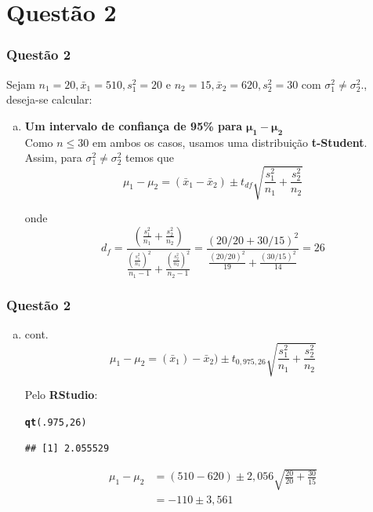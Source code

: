 \documentclass{beamer}\usepackage[]{graphicx}\usepackage[]{color}
\makeatletter
\newcommand{\hlnum}[1]{\textcolor[rgb]{0.686,0.059,0.569}{#1}}%
\newcommand{\hlstd}[1]{\textcolor[rgb]{0.345,0.345,0.345}{#1}}%
\newcommand{\hlkwd}[1]{\textcolor[rgb]{0.737,0.353,0.396}{\textbf{#1}}}%
\newenvironment{kframe}{%
 \def\at@end@of@kframe{}%
 \ifinner\ifhmode%
  \def\at@end@of@kframe{\end{minipage}}%
  \begin{minipage}{\columnwidth}%
 \fi\fi%
 \def\FrameCommand##1{\hskip\@totalleftmargin \hskip-\fboxsep
 \colorbox{shadecolor}{##1}\hskip-\fboxsep
     \hskip-\linewidth \hskip-\@totalleftmargin \hskip\columnwidth}%
 \MakeFramed {\advance\hsize-\width
   \@totalleftmargin\z@ \linewidth\hsize
   \@setminipage}}%
 {\par\unskip\endMakeFramed%
 \at@end@of@kframe}
\newenvironment{knitrout}{}{} %
\makeatother
\begin{document}
    \section{Questão 2}
    	\begin{frame}
    		\frametitle{Questão 2}
    		Sejam $n_{1} = 20, \bar{x}_{1} = 510, s^{2}_{1} = 20$ e $n_{2} = 15, \bar{x}_{2} = 620, s^{2}_{2} = 30$ com $\sigma_{1}^{2} \neq \sigma_{2}^{2}$., deseja-se calcular:\\
    		\begin{enumerate}[a)]
    			\item \textbf{{Um intervalo de confiança de 95\% para}} $\boldsymbol{\mu_{1} - \mu_{2}}$\\
    			
    			Como $n \leq 30$ em ambos os casos, usamos uma distribuição \textbf{t-Student}.  Assim, para $\sigma_{1}^{2} \neq \sigma_{2}^{2}$ temos que $$\mu_{1}-\mu_{2} = (\bar{x}_{1} - \bar{x}_{2}) \pm t_{df}\sqrt{\frac{s_{1}^{2}}{n_{1}}+\frac{s_{2}^{2}}{n_{2}}}$$
    			
    			onde $$d_{f} = \frac{(\frac{s_{1}^{2}}{n_{1}}+\frac{s_{2}^{2}}{n_{2}})}{\frac{(\frac{s_{1}^{2}}{n_{1}})^2}{n_{1}-1} + \frac{(\frac{s_{2}^{2}}{n_{2}})^2}{n_{2}-1}} = \frac{(20/20 + 30/15)^2}{\frac{(20/20)^2}{19}+\frac{(30/15)^2}{14}} = 26$$ 
    			
    		\end{enumerate}
    	\end{frame}
    	
    	\begin{frame}[fragile]
    		\frametitle{Questão 2}
    		\begin{enumerate}[a)]
    			\item cont.$$\mu_{1} - \mu_{2} = (\bar{x}_1) - \bar{x}_2)\pm t_{0,975,26}\sqrt{\frac{s_{1}^{2}}{n_{1}}+\frac{s_{2}^{2}}{n_{2}}}$$
    			
    			Pelo \textbf{RStudio}:
\begin{knitrout}
\color{fgcolor}\begin{kframe}
\begin{alltt}
\hlkwd{qt}\hlstd{(}\hlnum{.975}\hlstd{,}\hlnum{26}\hlstd{)}
\end{alltt}
\begin{verbatim}
## [1] 2.055529
\end{verbatim}
\end{kframe}
\end{knitrout}
    		\begin{align*}
		        \mu_{1} - \mu_{2} &= (510 - 620) \pm 2,056\sqrt{\frac{20}{20} + \frac{30}{15}}\\
			&= -110 \pm 3,561
				\end{align*}
    		\end{enumerate}
    	\end{frame}
    	
\end{document}
